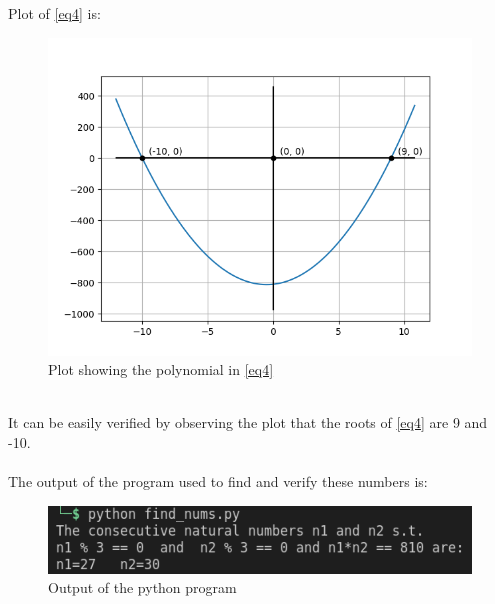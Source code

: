 \documentclass[journal, 12pt, twocolumn]{IEEEtran}
\begin{document}
    Plot of \autoref{eq4} is:
    \begin{figure}[h]
        \centering
        \includegraphics[width=\columnwidth]{plot.png}
        \caption{Plot showing the polynomial in \autoref{eq4}}
        \label{Fig1}
    \end{figure}\\
    It can be easily verified by observing the plot that the roots of \autoref{eq4} are 9 and -10.\\\\

    The output of the program used to find and verify these numbers is:
    \begin{figure}[h]
        \includegraphics[width=\columnwidth]{output.png}
        \caption{Output of the python program}
    \end{figure}
\end{document}
